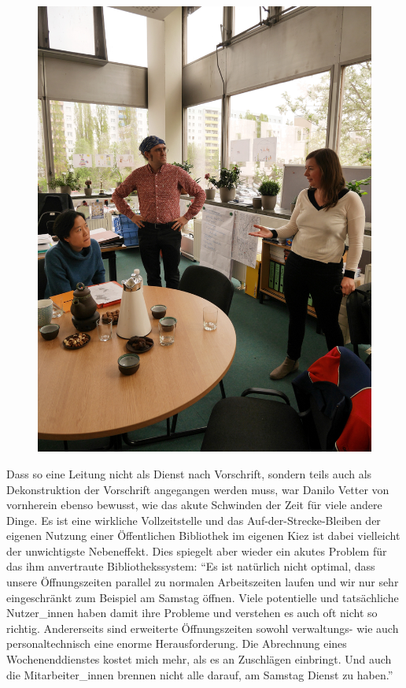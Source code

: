 \documentclass[a4paper,
fontsize=11pt,
oneside,
numbers=noperiodatend,
parskip=half-,
bibliography=totoc,
final
]{scrartcl}
\begin{document}
\begin{figure}
\centering
\includegraphics{img/libreas-boell-apr-2017.jpg}
\caption{}
\end{figure}

Dass so eine Leitung nicht als Dienst nach Vorschrift, sondern teils
auch als Dekonstruktion der Vorschrift angegangen werden muss, war
Danilo Vetter von vornherein ebenso bewusst, wie das akute Schwinden der
Zeit für viele andere Dinge. Es ist eine wirkliche Vollzeitstelle und
das Auf-der-Strecke-Bleiben der eigenen Nutzung einer Öffentlichen
Bibliothek im eigenen Kiez ist dabei vielleicht der unwichtigste
Nebeneffekt. Dies spiegelt aber wieder ein akutes Problem für das ihm
anvertraute Bibliothekssystem: \enquote{Es ist natürlich nicht optimal,
dass unsere Öffnungszeiten parallel zu normalen Arbeitszeiten laufen und
wir nur sehr eingeschränkt zum Beispiel am Samstag öffnen. Viele
potentielle und tatsächliche Nutzer\_innen haben damit ihre Probleme und
verstehen es auch oft nicht so richtig. Andererseits sind erweiterte
Öffnungszeiten sowohl verwaltungs- wie auch personaltechnisch eine
enorme Herausforderung. Die Abrechnung eines Wochenenddienstes kostet
mich mehr, als es an Zuschlägen einbringt. Und auch die
Mitarbeiter\_innen brennen nicht alle darauf, am Samstag Dienst zu
haben.}
\end{document}
